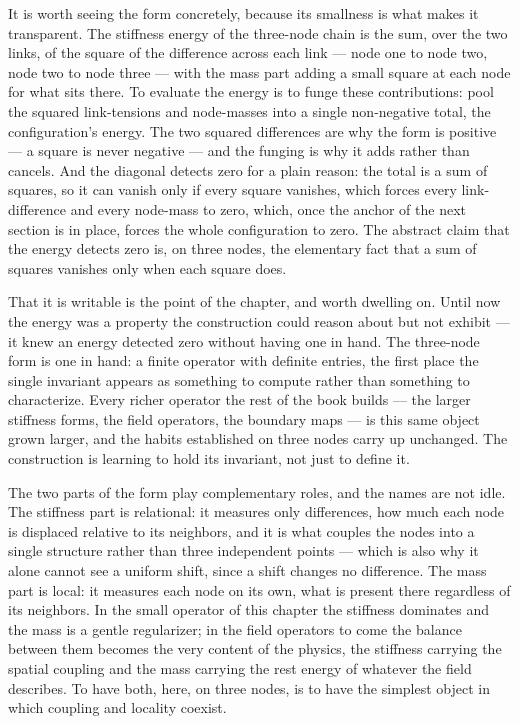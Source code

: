 It is worth seeing the form concretely, because its smallness is what makes it transparent. The
stiffness energy of the three-node chain is the sum, over the two links, of the square of the difference
across each link --- node one to node two, node two to node three --- with the mass part adding a small
square at each node for what sits there. To evaluate the energy is to funge these contributions: pool
the squared link-tensions and node-masses into a single non-negative total, the configuration's energy.
The two squared differences are why the form is positive --- a square is never negative --- and the
funging is why it adds rather than cancels. And the diagonal detects zero for a plain reason: the total
is a sum of squares, so it can vanish only if every square vanishes, which forces every link-difference
and every node-mass to zero, which, once the anchor of the next section is in place, forces the whole
configuration to zero. The abstract claim that the energy detects zero is, on three nodes, the
elementary fact that a sum of squares vanishes only when each square does.

That it is writable is the point of the chapter, and worth dwelling on. Until now the energy was a
property the construction could reason about but not exhibit --- it knew an energy detected zero without
having one in hand. The three-node form is one in hand: a finite operator with definite entries, the
first place the single invariant appears as something to compute rather than something to characterize.
Every richer operator the rest of the book builds --- the larger stiffness forms, the field operators,
the boundary maps --- is this same object grown larger, and the habits established on three nodes carry
up unchanged. The construction is learning to hold its invariant, not just to define it.

The two parts of the form play complementary roles, and the names are not idle. The stiffness part is
relational: it measures only differences, how much each node is displaced relative to its neighbors, and
it is what couples the nodes into a single structure rather than three independent points --- which is
also why it alone cannot see a uniform shift, since a shift changes no difference. The mass part is
local: it measures each node on its own, what is present there regardless of its neighbors. In the small
operator of this chapter the stiffness dominates and the mass is a gentle regularizer; in the field
operators to come the balance between them becomes the very content of the physics, the stiffness
carrying the spatial coupling and the mass carrying the rest energy of whatever the field describes. To
have both, here, on three nodes, is to have the simplest object in which coupling and locality coexist.


